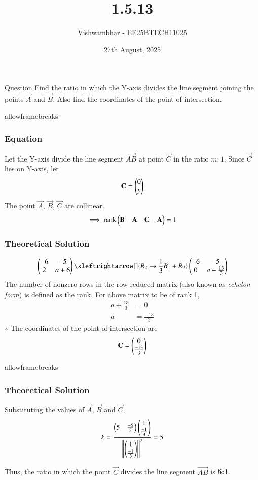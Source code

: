 \documentclass{beamer}
\title{1.5.13}
\date{27th August, 2025}
\author{Vishwambhar - EE25BTECH11025}
\begin{document}
\frame{\titlepage}
\begin{frame}{Question}
Find the ratio in which the Y-axis divides the line segment joining the points $\vec{A}$ and $\vec{B}$. Also find the coordinates of the point of intersection.
\end{frame}

\begin{frame}{allowframebreaks}
\frametitle{Equation}
Let the Y-axis divide the line segment $\vec{AB}$ at point $\vec{C}$ in the ratio $m:1$.
Since $\vec{C}$ lies on Y-axis, let
\begin{align*}
\mathbf{C} = \begin{pmatrix}0 \\ y\end{pmatrix}
\end{align*}
The point $\vec{A}$, $\vec{B}$, $\vec{C}$ are collinear.
\begin{align}
\implies \text{rank}\begin{pmatrix}\mathbf{B}-\mathbf{A} & \mathbf{C}-\mathbf{A}\end{pmatrix} = 1
\end{align}
\end{frame}

\begin{frame}[fragile]
	\frametitle{Theoretical Solution}
\begin{align}
	\myvec{-6 & -5 \\ 2 & a+6} \xleftrightarrow[]{R_2 \rightarrow {\frac{1}{3}R_1 + R_2}} \myvec{-6 & -5 \\ 0 & a+\frac{13}{3}}  
\end{align}
The number of nonzero rows in the row reduced matrix (also known as {\em echelon form}) is defined as the rank. For above matrix to be of rank 1,
\begin{align}
a+\frac{13}{3} &= 0 \\
a &= \frac{-13}{3}
\end{align}
$\therefore$ The coordinates of the point of intersection are 
\begin{align*}
\mathbf{C} = \begin{pmatrix}0 \\ \frac{-13}{3}\end{pmatrix}
\end{align*}
\end{frame}

\begin{frame}{allowframebreaks}
\frametitle{Theoretical Solution}
Substituting the values of $\vec{A}$, $\vec{B}$ and $\vec{C}$,
\begin{align}
k=\frac{\begin{pmatrix}5 & \frac{-5}{3}\end{pmatrix}\begin{pmatrix}1 \\ \frac{-1}{3}\end{pmatrix}}{\left\lVert\begin{pmatrix}1 \\ \frac{-1}{3}\end{pmatrix}\right\rVert^2}=5
\end{align}

Thus, the ratio in which the point $\vec{C}$ divides the line segment $\vec{AB}$ is \textbf{5:1}.
\end{frame}
\end{document}
